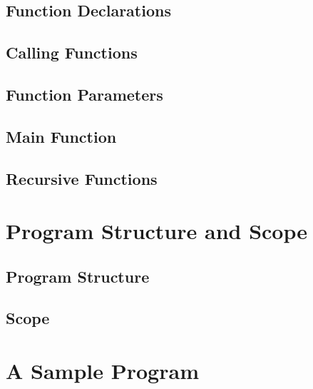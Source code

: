 \documentclass{article}
\begin{document}
\subsection{Function Declarations}

\subsection{Calling Functions}

\subsection{Function Parameters}

\subsection{Main Function}

\subsection{Recursive Functions}

\section{Program Structure and Scope}

\subsection{Program Structure}

\subsection{Scope}

\section{A Sample Program}
\end{document}
